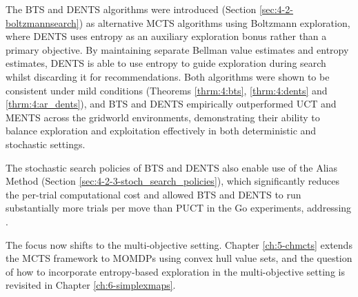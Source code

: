     The BTS and DENTS algorithms were introduced 
    (Section \ref{sec:4-2-boltzmannsearch}) as 
    alternative MCTS algorithms using Boltzmann exploration, 
    where DENTS uses entropy as an auxiliary 
    exploration bonus rather than a primary objective. 
    By maintaining separate Bellman value estimates and 
    entropy estimates, DENTS is able to use entropy to 
    guide exploration during search whilst discarding 
    it for recommendations. Both algorithms were shown 
    to be consistent under mild conditions 
    (Theorems \ref{thrm:4:bts}, \ref{thrm:4:dents} 
    and \ref{thrm:4:ar_dents}), and BTS and DENTS 
    empirically outperformed UCT and MENTS across the gridworld environments, 
    demonstrating their ability to balance exploration 
    and exploitation effectively in both deterministic 
    and stochastic settings.

    The stochastic search policies of BTS and DENTS 
    also enable use of the Alias Method 
    (Section \ref{sec:4-2-3-stoch_search_policies}), 
    which significantly reduces the per-trial 
    computational cost and allowed BTS and DENTS to 
    run substantially more trials per move than PUCT 
    in the Go experiments, addressing \complexityq.

    The focus now shifts to the multi-objective setting. 
    Chapter \ref{ch:5-chmcts} extends the MCTS framework 
    to MOMDPs using convex hull value sets, and the 
    question of how to incorporate entropy-based 
    exploration in the multi-objective setting is 
    revisited in Chapter \ref{ch:6-simplexmaps}.